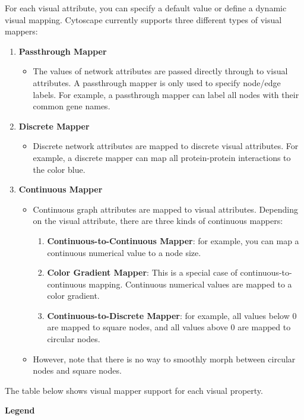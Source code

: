  For each visual attribute, you can specify a default value or define a dynamic visual mapping. Cytoscape currently supports three different types of visual mappers: 
\begin{enumerate}
\item \textbf{Passthrough Mapper}
\begin{itemize}
\item The values of network attributes are passed directly through to visual attributes. A passthrough mapper is only used to specify node/edge labels. For example, a passthrough mapper can label all nodes with their common gene names. 
\end{itemize}

\item \textbf{Discrete Mapper}
\begin{itemize}
\item Discrete network attributes are mapped to discrete visual attributes. For example, a discrete mapper can map all protein-protein interactions to the color blue. 
\end{itemize}

\item \textbf{Continuous Mapper}
\begin{itemize}
\item Continuous graph attributes are mapped to visual attributes. Depending on the visual attribute, there are three kinds of continuous mappers: \begin{enumerate}
\item \textbf{Continuous-to-Continuous Mapper}: for example, you can map a continuous numerical value to a node size. 
\item \textbf{Color Gradient Mapper}: This is a special case of continuous-to-continuous mapping. Continuous numerical values are mapped to a color gradient. 
\item \textbf{Continuous-to-Discrete Mapper}: for example, all values below 0 are mapped to square nodes, and all values above 0 are mapped to circular nodes. 
\end{enumerate}

\item However, note that there is no way to smoothly morph between circular nodes and square nodes. 
\end{itemize}
\end{enumerate}


 The table below shows visual mapper support for each visual property. 

 \textbf{Legend}

